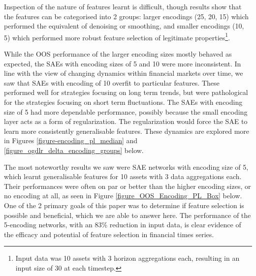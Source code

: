 \documentclass[a4paper,11pt,oneside]{article}
\theoremstyle{plain}
\theoremstyle{definition}
\begin{document}
	Inspection of the nature of features learnt is difficult, though results show that the features can be categorised into 2 groups: larger encodings (25, 20, 15) which performed the equivalent of denoising or smoothing, and smaller encodings (10, 5) which performed more robust feature selection of legitimate properties\footnote{Input data was 10 assets with 3 horizon aggregations each, resulting in an input size of 30 at each timestep.}.\newline

	While the OOS performance of the larger encoding sizes mostly behaved as expected, the SAEs with encoding sizes of 5 and 10 were more inconsistent. In line with the view of changing dynamics within financial markets over time, we saw that SAEs with encoding of 10 overfit to particular features. These performed well for strategies focusing on long term trends, but were pathological for the strategies focusing on short term fluctuations. The SAEs with encoding size of 5 had more dependable performance, possibly because the small encoding layer acts as a form of regularization. The regularization would force the SAE to learn more consistently generalisable features. These dynamics are explored more in Figures \ref{figure-encoding_pl_median} and \ref{figure_ogdlr_delta_encoding_groups} below.  \newline
	
	The most noteworthy results we saw were SAE networks with encoding size of 5, which learnt generalisable features for 10 assets with 3 data aggregations each. Their performances were often on par or better than the higher encoding sizes, or no encoding at all, as seen in Figure \ref{figure_OOS_Encoding_PL_Box} below. One of the 2 primary goals of this paper was to determine if feature selection is possible and beneficial, which we are able to answer here. The performance of the 5-encoding networks, with an 83\% reduction in input data, is clear evidence of the efficacy and potential of feature selection in financial times series.  \newline
	
\end{document}
